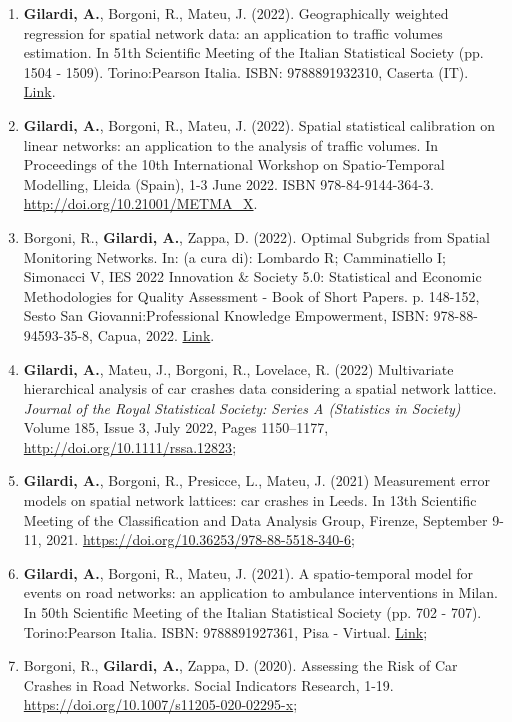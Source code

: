 \documentclass[11pt,a4paper,sans]{moderncv}
\begin{document}
\begin{enumerate}
  \item \textbf{Gilardi, A.}, Borgoni, R., Mateu, J. (2022). Geographically weighted regression for spatial network data: an application to traffic volumes estimation. In 51th Scientific Meeting of the Italian Statistical Society (pp. 1504 - 1509). Torino:Pearson Italia. ISBN: 9788891932310, Caserta (IT). \href{https://it.pearson.com/content/dam/region-core/italy/pearson-italy/pdf/Docenti/Universit%C3%A0/Sis-2022-4c-low.pdf}{Link}. 
  \item \textbf{Gilardi, A.}, Borgoni, R., Mateu, J. (2022). Spatial statistical calibration on linear networks: an application to the analysis of traffic volumes. In Proceedings of the 10th International Workshop on Spatio-Temporal Modelling, Lleida (Spain), 1-3 June 2022. ISBN 978-84-9144-364-3. \url{http://doi.org/10.21001/METMA\_X}. 
  \item Borgoni, R., \textbf{Gilardi, A.}, Zappa, D. (2022). Optimal Subgrids from Spatial Monitoring Networks. In: (a cura di): Lombardo R; Camminatiello I; Simonacci V, IES 2022 Innovation \& Society 5.0: Statistical and Economic Methodologies for Quality Assessment - Book of Short Papers. p. 148-152, Sesto San Giovanni:Professional Knowledge Empowerment, ISBN: 978-88-94593-35-8, Capua, 2022.  \href{https://drive.google.com/file/d/1HEZG50lecMyx_NDRLi2Y7d0papiX9ZWO/view}{Link}.
  \item \textbf{Gilardi, A.}, Mateu, J., Borgoni, R., Lovelace, R. (2022) Multivariate hierarchical analysis of car crashes data considering a spatial network lattice. \textit{Journal of the Royal Statistical Society: Series A (Statistics in Society)} Volume 185, Issue 3, July 2022, Pages 1150–1177, \url{http://doi.org/10.1111/rssa.12823};
  \item \textbf{Gilardi, A.}, Borgoni, R., Presicce, L., Mateu, J. (2021) Measurement error models on spatial network lattices: car crashes in Leeds. In 13th Scientific Meeting of the Classification and Data Analysis Group, Firenze, September 9-11, 2021. \url{https://doi.org/10.36253/978-88-5518-340-6}; 
  \item \textbf{Gilardi, A.}, Borgoni, R., Mateu, J. (2021). A spatio-temporal model for events on road networks: an application to ambulance interventions in Milan. In 50th Scientific Meeting of the Italian Statistical Society (pp. 702 - 707). Torino:Pearson Italia. ISBN: 9788891927361, Pisa - Virtual. \href{https://it.pearson.com/content/dam/region-core/italy/pearson-italy/pdf/Docenti/Universit%C3%A0/pearson-sis-book-2021-parte-1.pdf}{Link}; 
  \item Borgoni, R., \textbf{Gilardi, A.}, Zappa, D. (2020). Assessing the Risk of Car Crashes in Road Networks. Social Indicators Research, 1-19. \url{https://doi.org/10.1007/s11205-020-02295-x};

\end{enumerate}
\end{document}
